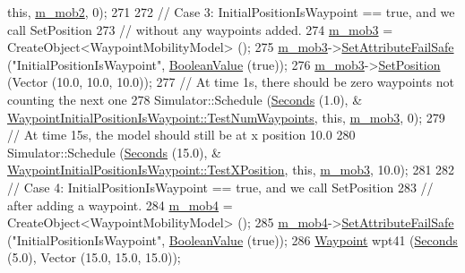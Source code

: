\begin{DoxyCode}
{      this}, \hyperlink{classWaypointInitialPositionIsWaypoint_a7900aaed6cf7a4022808b6905d6d71c1}{m\_mob2}, 0);
271 
272   \textcolor{comment}{// Case 3:  InitialPositionIsWaypoint == true, and we call SetPosition}
273   \textcolor{comment}{// without any waypoints added.}
274   \hyperlink{classWaypointInitialPositionIsWaypoint_ae5d635a7eddf81f70c712ad7a20de402}{m\_mob3} = CreateObject<WaypointMobilityModel> ();
275   \hyperlink{classWaypointInitialPositionIsWaypoint_ae5d635a7eddf81f70c712ad7a20de402}{m\_mob3}->\hyperlink{classns3_1_1ObjectBase_aa7d333004e970f925a4ed5df275541b5}{SetAttributeFailSafe} (\textcolor{stringliteral}{"InitialPositionIsWaypoint"}, 
      \hyperlink{classns3_1_1BooleanValue}{BooleanValue} (\textcolor{keyword}{true}));
276   \hyperlink{classWaypointInitialPositionIsWaypoint_ae5d635a7eddf81f70c712ad7a20de402}{m\_mob3}->\hyperlink{classns3_1_1MobilityModel_ac584b3d5a309709d2f13ed6ada1e7640}{SetPosition} (Vector (10.0, 10.0, 10.0));
277   \textcolor{comment}{// At time 1s, there should be zero waypoints not counting the next one}
278   Simulator::Schedule (\hyperlink{group__timecivil_ga33c34b816f8ff6628e33d5c8e9713b9e}{Seconds} (1.0), &
      \hyperlink{classWaypointInitialPositionIsWaypoint_ac5c7ce5037e8704d07e7ed5cd1b8646f}{WaypointInitialPositionIsWaypoint::TestNumWaypoints}, \textcolor{keyword}{
      this}, \hyperlink{classWaypointInitialPositionIsWaypoint_ae5d635a7eddf81f70c712ad7a20de402}{m\_mob3}, 0);
279   \textcolor{comment}{// At time 15s, the model should still be at x position 10.0}
280   Simulator::Schedule (\hyperlink{group__timecivil_ga33c34b816f8ff6628e33d5c8e9713b9e}{Seconds} (15.0), &
      \hyperlink{classWaypointInitialPositionIsWaypoint_aca01ac096251d1abe559ea98cad123e6}{WaypointInitialPositionIsWaypoint::TestXPosition}, \textcolor{keyword}{this}, 
      \hyperlink{classWaypointInitialPositionIsWaypoint_ae5d635a7eddf81f70c712ad7a20de402}{m\_mob3}, 10.0);
281 
282   \textcolor{comment}{// Case 4:  InitialPositionIsWaypoint == true, and we call SetPosition}
283   \textcolor{comment}{// after adding a waypoint.}
284   \hyperlink{classWaypointInitialPositionIsWaypoint_a314ea7cc7f3a519067fb64153e6f3e2f}{m\_mob4} = CreateObject<WaypointMobilityModel> ();
285   \hyperlink{classWaypointInitialPositionIsWaypoint_a314ea7cc7f3a519067fb64153e6f3e2f}{m\_mob4}->\hyperlink{classns3_1_1ObjectBase_aa7d333004e970f925a4ed5df275541b5}{SetAttributeFailSafe} (\textcolor{stringliteral}{"InitialPositionIsWaypoint"}, 
      \hyperlink{classns3_1_1BooleanValue}{BooleanValue} (\textcolor{keyword}{true}));
286   \hyperlink{classns3_1_1Waypoint}{Waypoint} wpt41 (\hyperlink{group__timecivil_ga33c34b816f8ff6628e33d5c8e9713b9e}{Seconds} (5.0), Vector (15.0, 15.0, 15.0));

\end{DoxyCode}
